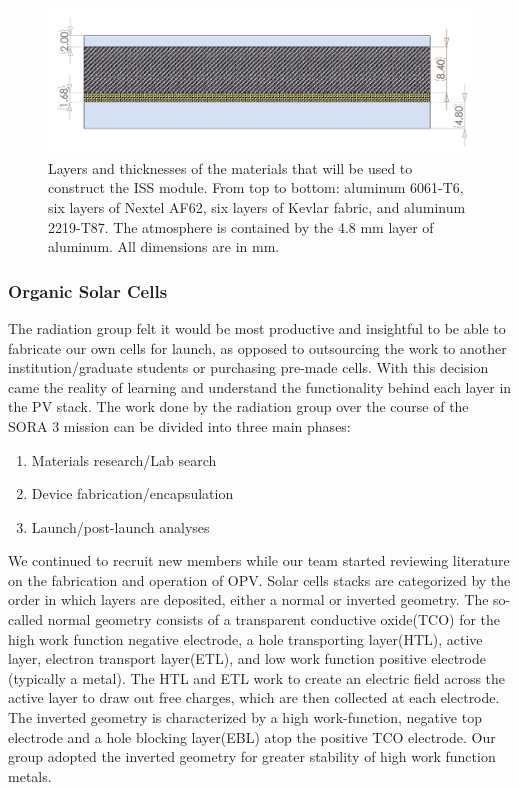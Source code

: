 \begin{figure}[h!]
	\begin{center}
		\includegraphics[width=\textwidth]{figures/iss-cross-section.png}
		\caption{Layers and thicknesses of the materials that will be used to construct the ISS module. From top to bottom: aluminum 6061-T6, six layers of Nextel AF62, six layers of Kevlar fabric, and aluminum 2219-T87. The atmosphere is contained by the 4.8 mm layer of aluminum. All dimensions are in mm.}
		\label{fig:iss-module}
	\end{center}
\end{figure}

\subsubsection{Organic Solar Cells}

The radiation group felt it would be most productive and insightful to be able to fabricate our own cells for launch, as opposed to outsourcing the work to another institution/graduate students or purchasing pre-made cells. With this decision came the reality of learning and understand the functionality behind each layer in the PV stack. The work done by the radiation group over the course of the SORA 3 mission can be divided into three main phases:
	
	\begin{enumerate}
		\item Materials research/Lab search
		\item Device fabrication/encapsulation
		\item Launch/post-launch analyses 
	\end{enumerate}
	
	We continued to recruit new members while our team started reviewing literature on the fabrication and operation of OPV. Solar cells stacks are categorized by the order in which layers are deposited, either a normal or inverted geometry. The so-called normal geometry consists of a transparent conductive oxide(TCO) for the high work function negative electrode, a hole transporting layer(HTL), active layer, electron transport layer(ETL), and low work function positive electrode (typically a metal). The HTL and ETL work to create an electric field across the active layer to draw out free charges, which are then collected at each electrode. The inverted geometry is characterized by a high work-function, negative top electrode and a hole blocking layer(EBL) atop the positive TCO electrode. Our group adopted the inverted geometry for greater stability of high work function metals.\\

